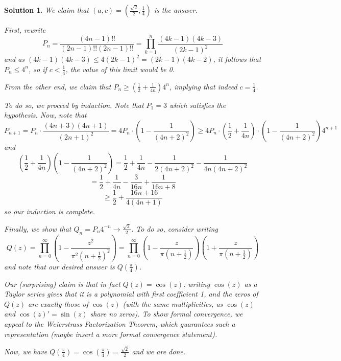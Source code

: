\documentclass[12pt]{article}
\newtheorem{solution}{Solution}
\begin{document}
\begin{solution}

We claim that \( (a, c) = \left( \frac{\sqrt{2}}{2}, \frac{1}{4} \right) \) is the answer.

First, rewrite
\[
P_n = \frac{(4n - 1)!!}{(2n - 1)!! (2n - 1)!!} = \prod_{k=1}^n \frac{(4k - 1)(4k - 3)}{(2k - 1)^2}
\]
and as \( (4k - 1)(4k - 3) \leq 4(2k - 1)^2 = (2k - 1)(4k - 2) \), it follows that \( P_n \leq 4^n \), so if \( c < \frac{1}{4} \), the value of this limit would be 0.

From the other end, we claim that \( P_n \geq \left( \frac{1}{2} + \frac{1}{4n} \right) 4^n \), implying that indeed \( c = \frac{1}{4} \).

To do so, we proceed by induction. Note that \( P_1 = 3 \) which satisfies the hypothesis. Now, note that
\[
P_{n+1} = P_n \cdot \frac{(4n + 3)(4n + 1)}{(2n + 1)^2} = 4P_n \cdot \left(1 - \frac{1}{(4n + 2)^2}\right) \geq 4P_n \cdot \left(\frac{1}{2} + \frac{1}{4n}\right) \cdot \left(1 - \frac{1}{(4n + 2)^2}\right) 4^{n+1}
\]
and
\[
\left(\frac{1}{2} + \frac{1}{4n}\right) \left(1 - \frac{1}{(4n + 2)^2}\right) = \frac{1}{2} + \frac{1}{4n} - \frac{1}{2(4n + 2)^2} - \frac{1}{4n(4n + 2)^2}
\]
\[
= \frac{1}{2} + \frac{1}{4n} - \frac{3}{16n} + \frac{1}{16n + 8}
\]
\[
\geq \frac{1}{2} + \frac{16n + 16}{4(4n + 1)}
\]
so our induction is complete.

Finally, we show that \( Q_n = P_n 4^{-n} \to \frac{\sqrt{2}}{2} \). To do so, consider writing
\[
Q(z) = \prod_{n=0}^\infty \left(1 - \frac{z^2}{\pi^2 (n + \frac{1}{2})^2}\right) = \prod_{n=0}^\infty \left(1 - \frac{z}{\pi(n + \frac{1}{2})}\right)\left(1 + \frac{z}{\pi(n + \frac{1}{2})}\right)
\]
and note that our desired answer is \( Q\left(\frac{\pi}{4}\right) \).

Our (surprising) claim is that in fact \( Q(z) = \cos(z) \): writing \( \cos(z) \) as a Taylor series gives that it is a polynomial with first coefficient 1, and the zeros of \( Q(z) \) are exactly those of \( \cos(z) \) (with the same multiplicities, as \( \cos(z) \) and \( \cos(z)' = \sin(z) \) share no zeros). To show formal convergence, we appeal to the Weierstrass Factorization Theorem, which guarantees such a representation (maybe insert a more formal convergence statement).

Now, we have \( Q\left(\frac{\pi}{4}\right) = \cos\left(\frac{\pi}{4}\right) = \frac{\sqrt{2}}{2} \) and we are done.
\end{solution}
\end{document}
